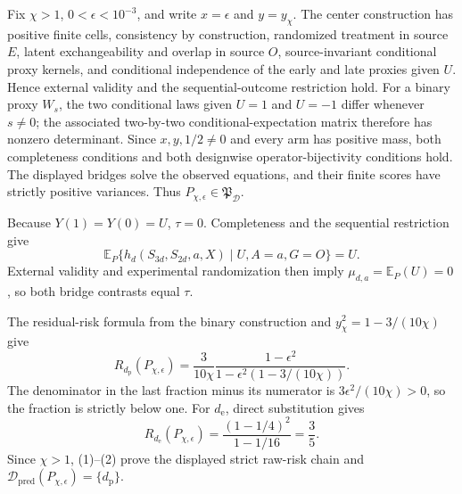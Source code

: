 Fix \(\chi>1\), \(0<\epsilon<10^{-3}\), and write \(x=\epsilon\) and \(y=y_\chi\). The center construction has positive finite cells, consistency by construction, randomized treatment in source \(E\), latent exchangeability and overlap in source \(O\), source-invariant conditional proxy kernels, and conditional independence of the early and late proxies given \(U\). Hence external validity and the sequential-outcome restriction hold. For a binary proxy \(W_s\), the two conditional laws given \(U=1\) and \(U=-1\) differ whenever \(s\ne0\); the associated two-by-two conditional-expectation matrix therefore has nonzero determinant. Since \(x,y,1/2\ne0\) and every arm has positive mass, both completeness conditions and both designwise operator-bijectivity conditions hold. The displayed bridges solve the observed equations, and their finite scores have strictly positive variances. Thus \(P_{\chi,\epsilon}\in\mathfrak P_{\mathcal D}\).

Because \(Y(1)=Y(0)=U\), \(\tau=0\). Completeness and the sequential restriction give
\[
 \mathbb E_P\{h_d(S_{3d},S_{2d},a,X)\mid U,A=a,G=O\}=U.
\]
External validity and experimental randomization then imply \(\mu_{d,a}=\mathbb E_P(U)=0\), so both bridge contrasts equal \(\tau\).

The residual-risk formula from the binary construction and \(y_\chi^2=1-3/(10\chi)\) give
\[
 R_{d_{\mathrm p}}(P_{\chi,\epsilon})
 =\frac{3}{10\chi}\frac{1-\epsilon^2}
 {1-\epsilon^2(1-3/(10\chi))}. \tag{1}
\]
The denominator in the last fraction minus its numerator is \(3\epsilon^2/(10\chi)>0\), so the fraction is strictly below one. For \(d_{\mathrm e}\), direct substitution gives
\[
 R_{d_{\mathrm e}}(P_{\chi,\epsilon})
 =\frac{(1-1/4)^2}{1-1/16}=\frac35. \tag{2}
\]
Since \(\chi>1\), (1)--(2) prove the displayed strict raw-risk chain and \(\mathcal D_{\mathrm{pred}}(P_{\chi,\epsilon})=\{d_{\mathrm p}\}\).

